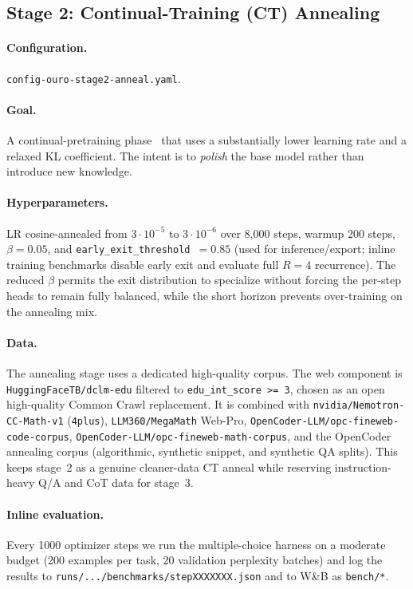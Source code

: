 \documentclass[11pt,a4paper]{article}
\begin{document}
\subsection{Stage 2: Continual-Training (CT) Annealing}

\paragraph{Configuration.}
\texttt{config-ouro-stage2-anneal.yaml}.

\paragraph{Goal.}
A continual-pretraining phase~\cite{ouro2025} that uses a substantially
lower learning rate and a relaxed KL coefficient. The intent is to
\emph{polish} the base model rather than introduce new knowledge.

\paragraph{Hyperparameters.}
LR cosine-annealed from $3 \cdot 10^{-5}$ to $3 \cdot 10^{-6}$ over 8{,}000
steps, warmup 200 steps, $\beta = 0.05$, and \texttt{early\_exit\_threshold
$= 0.85$} (used for inference/export; inline training benchmarks disable early
exit and evaluate full $R=4$ recurrence). The reduced $\beta$ permits the exit
distribution to specialize without forcing the per-step heads to remain fully
balanced, while the short horizon prevents over-training on the annealing mix.

\paragraph{Data.}
The annealing stage uses a dedicated high-quality corpus. The web component is
\texttt{HuggingFaceTB/dclm-edu} filtered to \texttt{edu\_int\_score >= 3},
chosen as an open high-quality Common Crawl replacement. It is combined with
\texttt{nvidia/Nemotron-CC-Math-v1} (\texttt{4plus}),
\texttt{LLM360/MegaMath} Web-Pro, \texttt{OpenCoder-LLM/opc-fineweb-code-corpus},
\texttt{OpenCoder-LLM/opc-fineweb-math-corpus}, and the OpenCoder annealing
corpus (algorithmic, synthetic snippet, and synthetic QA splits). This keeps
stage~2 as a genuine cleaner-data CT anneal while reserving instruction-heavy
Q/A and CoT data for stage~3.

\paragraph{Inline evaluation.}
Every 1000 optimizer steps we run the multiple-choice harness on a moderate
budget (200 examples per task, 20 validation perplexity batches) and log
the results to \texttt{runs/.../benchmarks/stepXXXXXXX.json} and to W\&B as
\texttt{bench/*}.
\end{document}
